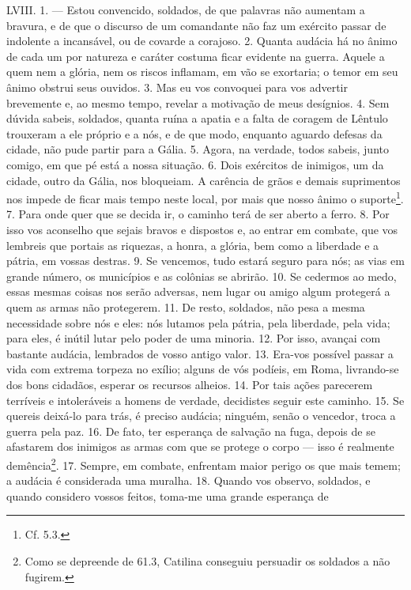 LVIII. 1. --- Estou convencido, soldados, de que palavras não aumentam a
bravura, e de que o discurso de um comandante não faz um exército passar de
indolente a incansável, ou de covarde a corajoso. 2. Quanta audácia há no ânimo
de cada um por natureza e caráter costuma ficar evidente na guerra. Aquele a
quem nem a glória, nem os riscos inflamam, em vão se exortaria; o temor em seu
ânimo obstrui seus ouvidos. 3. Mas eu vos convoquei para vos advertir
brevemente e, ao mesmo tempo, revelar a motivação de meus desígnios. 4. Sem
dúvida sabeis, soldados, quanta ruína a apatia e a falta de coragem de Lêntulo
trouxeram a ele próprio e a nós, e de que modo, enquanto aguardo defesas da
cidade, não pude partir para a Gália. 5. Agora, na verdade, todos sabeis, junto
comigo, em que pé está a nossa situação. 6. Dois exércitos de inimigos, um da
cidade, outro da Gália, nos bloqueiam. A carência de grãos e demais suprimentos
nos impede de ficar mais tempo neste local, por mais que nosso ânimo o
suporte\footnote{Cf. 5.3.}. 7. Para onde quer que se decida ir, o caminho terá
de ser aberto a ferro. 8. Por isso vos aconselho que sejais bravos e dispostos
e, ao entrar em combate, que vos lembreis que portais as riquezas, a honra, a
glória, bem como a liberdade e a pátria, em vossas destras. 9. Se vencemos,
tudo estará seguro para nós; as vias em grande número, os municípios e as
colônias se abrirão. 10. Se cedermos ao medo, essas mesmas coisas nos serão
adversas, nem lugar ou amigo algum protegerá a quem as armas não protegerem.
11. De resto, soldados, não pesa a mesma necessidade sobre nós e eles: nós
lutamos pela pátria, pela liberdade, pela vida; para eles, é inútil lutar pelo
poder de uma minoria. 12. Por isso, avançai com bastante audácia, lembrados de
vosso antigo valor. 13. Era-vos possível passar a vida com extrema torpeza no
exílio; alguns de vós podíeis, em Roma, livrando-se dos bons cidadãos, esperar
os recursos alheios. 14. Por tais ações parecerem terríveis e intoleráveis a
homens de verdade, decidistes seguir este caminho. 15. Se quereis deixá-lo para
trás, é preciso audácia; ninguém, senão o vencedor, troca a guerra pela paz.
16. De fato, ter esperança de salvação na fuga, depois de se afastarem dos
inimigos as armas com que se protege o corpo --- isso é realmente
demência\footnote{Como se depreende de 61.3, Catilina conseguiu persuadir os
soldados a não fugirem.}. 17. Sempre, em combate, enfrentam maior perigo os que
mais temem; a audácia é considerada uma muralha. 18. Quando vos observo,
soldados, e quando considero vossos feitos, toma-me uma grande esperança de
